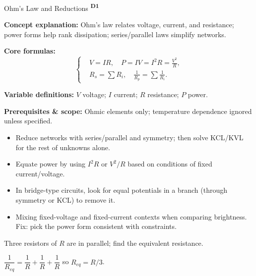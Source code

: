 ﻿\documentclass[12pt,a4paper]{article}
\providecommand{\KPFormulas}{}
\providecommand{\KPHeuristics}{}
\providecommand{\KPProblems}{}
\newcommand{\DOne}{\texorpdfstring{\textsuperscript{\textbf{D1}}}{ D1}}
\begin{document}


\begin{KnowledgePoint}{Ohm's Law and Reductions \DOne}
  \KPFormulas
  \begin{formulabox}
  \textbf{Concept explanation:} Ohm's law relates voltage, current, and resistance; power forms help rank dissipation; series/parallel laws simplify networks.

  \textbf{Core formulas:}
  \[
  \left\{\begin{aligned}
    &V=IR,\quad P=IV=I^2R=\frac{V^2}{R},\\
    &R_s=\sum R_i,\quad \frac{1}{R_p}=\sum \frac{1}{R_i}.
  \end{aligned}\right.
  \]

  \textbf{Variable definitions:} $V$ voltage; $I$ current; $R$ resistance; $P$ power.

  \textbf{Prerequisites \& scope:} Ohmic elements only; temperature dependence ignored unless specified.
  \end{formulabox}

  \KPHeuristics
  \begin{heuristicsbox}
\begin{itemize}[leftmargin=*]
  \item Reduce networks with series/parallel and symmetry; then solve KCL/KVL for the rest of unknowns alone.
  \item Equate power by using $I^2 R$ or $V^2/R$ based on conditions of fixed current/voltage.
  \item In bridge-type circuits, look for equal potentials in a branch (through symmetry or KCL) to remove it.
\end{itemize}
  \vspace{0.4em}
  \begin{itemize}[leftmargin=*]
    \item Mixing fixed-voltage and fixed-current contexts when comparing brightness. Fix: pick the power form consistent with constraints.
  \end{itemize}
  \end{heuristicsbox}

  \KPProblems
\begin{cheatproblem}
  Three resistors of $R$ are in parallel; find the equivalent resistance.
  \begin{solutionbox}
  $\dfrac{1}{R_{eq}}=\dfrac{1}{R}+\dfrac{1}{R}+\dfrac{1}{R}$ so $R_{eq}=R/3$.
  \end{solutionbox}
  \end{cheatproblem}
\end{KnowledgePoint}
\end{document}
